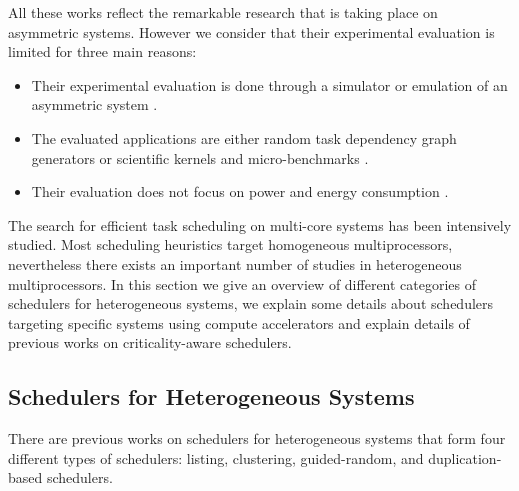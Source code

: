 

All these works reflect the remarkable research that is taking place on asymmetric systems. 
However we consider that their experimental evaluation is limited for three main reasons:
\begin{itemize}
  \item Their experimental evaluation is done through a simulator or emulation of an asymmetric system \cite{Kumar_micro_2003, Kumar:ISCA2004, Morad_area_based, Balakrishnan:ISCA2005, Koufaty_bias, VanCraeynest_fairness, VanCraeynest_PIE, Rodrigues_thread_scheduling, Hetero93, Hetero95, Dup09, Suleman:APLOS2009, Joao:ASPLOS2012,Joao:ISCA2013}.
  \item The evaluated applications are either random task dependency graph generators or scientific kernels and micro-benchmarks \cite{Hetero93, HEFT, LDCP}.
  \item Their evaluation does not focus on power and energy consumption \cite{Kumar:ISCA2004, VanCraeynest_fairness, VanCraeynest_PIE, Hetero93, Hetero95}.
\end{itemize}

The search for efficient task scheduling on multi-core systems has been intensively studied. Most scheduling heuristics target homogeneous multiprocessors, nevertheless there exists an important number of studies in heterogeneous multiprocessors. In this section we give an overview of different categories of schedulers for heterogeneous systems, we explain some details about schedulers targeting specific systems using compute accelerators and explain details of previous works on criticality-aware schedulers.

\subsection{Schedulers for Heterogeneous Systems}

There are previous works on schedulers for heterogeneous systems that form four different types of schedulers: listing, clustering, guided-random, and duplication-based schedulers.


